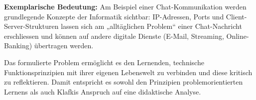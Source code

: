 \textbf{Exemplarische Bedeutung:} Am Beispiel einer Chat-Kommunikation werden grundlegende Konzepte der Informatik sichtbar: IP-Adressen, Ports und Client-Server-Strukturen lassen sich am „alltäglichen Problem“ einer Chat-Nachricht erschliessen und können auf andere digitale Dienste (E-Mail, Streaming, Online-Banking) übertragen werden.

Das formulierte Problem ermöglicht es den Lernenden, technische Funktionsprinzipien mit ihrer eigenen Lebenswelt zu verbinden und diese kritisch zu reflektieren. Damit entspricht es sowohl den Prinzipien problemorientierten Lernens als auch Klafkis Anspruch auf eine didaktische Analyse.\clearpage